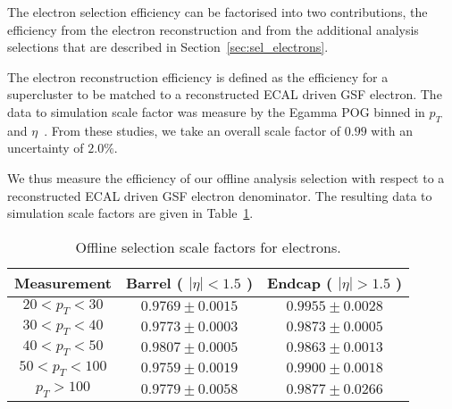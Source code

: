 
The electron selection efficiency can be factorised into two contributions,
the efficiency from the electron reconstruction and from the additional
analysis selections that are described in Section~\ref{sec:sel_electrons}.

The electron reconstruction efficiency is defined as the efficiency for a
supercluster to be matched to a reconstructed ECAL driven GSF electron.
The data to simulation scale factor was measure by the Egamma POG binned in
$p_T$ and $\eta$~\cite{ref:egamma_eff_gsf}. From these studies, we take an overall scale factor of
$0.99$ with an uncertainty of $2.0\%$.

We thus measure the efficiency of our offline analysis selection 
with respect to a reconstructed ECAL driven GSF electron denominator. 
The resulting data to simulation scale factors are given in Table~\ref{tab:eff_ele_offline}.


\begin{table}[!ht]
\begin{center}
\begin{tabular}{c|c|c}
\hline
Measurement & Barrel ( $|\eta|<1.5$ )   & Endcap ( $|\eta|>1.5$ )  \\ 
\hline
$20 < p_T < 30$  & $0.9769 \pm 0.0015$ & $0.9955 \pm 0.0028$  \\ \hline
$30 < p_T < 40$  & $0.9773 \pm 0.0003$ & $0.9873 \pm 0.0005$  \\ \hline
$40 < p_T < 50$  & $0.9807 \pm 0.0005$ & $0.9863 \pm 0.0013$  \\ \hline
$50 < p_T < 100$ & $0.9759 \pm 0.0019$ & $0.9900 \pm 0.0018$  \\ \hline
$p_T > 100$      & $0.9779 \pm 0.0058$ & $0.9877 \pm 0.0266$  \\ \hline 
\end{tabular}
\caption{Offline selection scale factors for electrons.}
\label{tab:eff_ele_offline}
\end{center}
\end{table}

